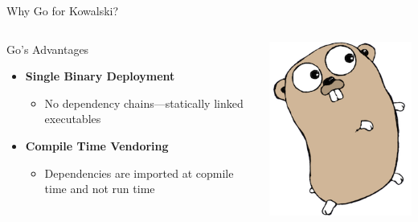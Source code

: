 \documentclass[aspectratio=169]{beamer}
\begin{document}
\begin{frame}{Why Go for Kowalski?}
\begin{columns}
\begin{block}{Go's Advantages}
\begin{itemize}
    \item \textbf{Single Binary Deployment}  
    \begin{itemize}
        \item No dependency chains—statically linked executables  
    \end{itemize}
    \item \textbf{Compile Time Vendoring}  
    \begin{itemize}
        \item Dependencies are imported at copmile time and not run time 
    \end{itemize}
\end{itemize}
\end{block}
\includegraphics[width=\linewidth]{gopher}
\end{columns}
\end{frame}
\end{document}
